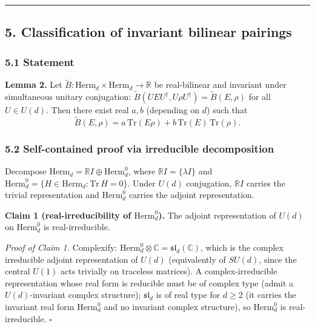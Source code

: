 \documentclass[
]{article}
\begin{document}
\begin{center}\rule{0.5\linewidth}{0.5pt}\end{center}

\subsection{5. Classification of invariant bilinear
pairings}\label{classification-of-invariant-bilinear-pairings}

\subsubsection{5.1 Statement}\label{statement-1}

\textbf{Lemma 2.} Let
\(\widetilde B:\mathrm{Herm}_d\times\mathrm{Herm}_d\to\mathbb R\) be
real-bilinear and invariant under simultaneous unitary conjugation:
\(\widetilde B(UEU^\dagger,U\rho U^\dagger)=\widetilde B(E,\rho)\) for
all \(U\in U(d)\). Then there exist real \(a,b\) (depending on \(d\))
such that
\[\widetilde B(E,\rho)=a\,\mathrm{Tr}(E\rho)+b\,\mathrm{Tr}(E)\,\mathrm{Tr}(\rho).\]

\subsubsection{5.2 Self-contained proof via irreducible
decomposition}\label{self-contained-proof-via-irreducible-decomposition}

Decompose \(\mathrm{Herm}_d=\mathbb RI\oplus\mathrm{Herm}_d^0\), where
\(\mathbb RI=\{\lambda I\}\) and
\(\mathrm{Herm}_d^0=\{H\in\mathrm{Herm}_d:\mathrm{Tr}\,H=0\}\). Under
\(U(d)\) conjugation, \(\mathbb RI\) carries the trivial representation
and \(\mathrm{Herm}_d^0\) carries the adjoint representation.

\textbf{Claim 1 (real-irreducibility of \(\mathrm{Herm}_d^0\)).} The
adjoint representation of \(U(d)\) on \(\mathrm{Herm}_d^0\) is
real-irreducible.

\emph{Proof of Claim 1.} Complexify:
\(\mathrm{Herm}_d^0\otimes\mathbb C=\mathfrak{sl}_d(\mathbb C)\), which
is the complex irreducible adjoint representation of \(U(d)\)
(equivalently of \(SU(d)\), since the central \(U(1)\) acts trivially on
traceless matrices). A complex-irreducible representation whose real
form is reducible must be of complex type (admit a \(U(d)\)-invariant
complex structure); \(\mathfrak{sl}_d\) is of real type for \(d\geq 2\)
(it carries the invariant real form \(\mathrm{Herm}_d^0\) and no
invariant complex structure), so \(\mathrm{Herm}_d^0\) is
real-irreducible. \(\square\)
\end{document}
